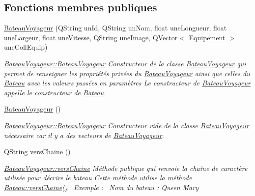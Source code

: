 \subsection*{Fonctions membres publiques}
\begin{DoxyCompactItemize}
\item 
\hyperlink{class_bateau_voyageur_ab2351c630bf3661b8273c66017c1ed72}{Bateau\+Voyageur} (Q\+String un\+Id, Q\+String un\+Nom, float une\+Longueur, float une\+Largeur, float une\+Vitesse, Q\+String une\+Image, Q\+Vector$<$ \hyperlink{class_equipement}{Equipement} $>$ une\+Coll\+Equip)
\begin{DoxyCompactList}\small\item\em \hyperlink{class_bateau_voyageur_ab2351c630bf3661b8273c66017c1ed72}{Bateau\+Voyageur\+::\+Bateau\+Voyageur} Constructeur de la classe \hyperlink{class_bateau_voyageur}{Bateau\+Voyageur} qui permet de renseigner les propriétés privées du \hyperlink{class_bateau_voyageur}{Bateau\+Voyageur} ainsi que celles du \hyperlink{class_bateau}{Bateau} avec les valeurs passées en paramètres Le constructeur de \hyperlink{class_bateau_voyageur}{Bateau\+Voyageur} appelle le constructeur de \hyperlink{class_bateau}{Bateau}. \end{DoxyCompactList}\item 
\hyperlink{class_bateau_voyageur_ac327b0101a2586190a3afcd639f146cc}{Bateau\+Voyageur} ()
\begin{DoxyCompactList}\small\item\em \hyperlink{class_bateau_voyageur_ab2351c630bf3661b8273c66017c1ed72}{Bateau\+Voyageur\+::\+Bateau\+Voyageur} Constructeur vide de la classe \hyperlink{class_bateau_voyageur}{Bateau\+Voyageur} nécessaire car il y a des vecteurs de \hyperlink{class_bateau_voyageur}{Bateau\+Voyageur}. \end{DoxyCompactList}\item 
Q\+String \hyperlink{class_bateau_voyageur_a3fa14cf7db3a1a35457f1e0450d7e8b2}{vers\+Chaine} ()
\begin{DoxyCompactList}\small\item\em \hyperlink{class_bateau_voyageur_a3fa14cf7db3a1a35457f1e0450d7e8b2}{Bateau\+Voyageur\+::vers\+Chaine} Méthode publique qui renvoie la chaîne de caractère utilisée pour décrire le bateau Cette méthode utilise la méthode \hyperlink{class_bateau_a392f6a45649a2a35186dfcd1ca58eddc}{Bateau\+::vers\+Chaine()}~\newline
Exemple \+:~\newline
Nom du bateau \+: Queen Mary~\newline

\end{DoxyCompactList}
\end{DoxyCompactItemize}
